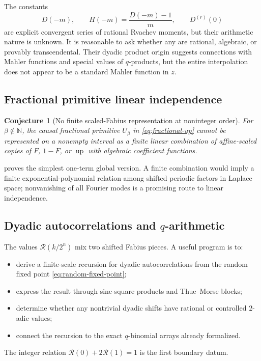 \documentclass[11pt]{article}
\newtheorem{conjecture}[theorem]{Conjecture}
\theoremstyle{definition}
\theoremstyle{remark}
\DeclareMathOperator{\upf}{up}
\newcommand{\N}{\mathbb N}
\begin{document}
The constants
\begin{equation}
 D(-m),\qquad H(-m)=\frac{D(-m)-1}{m},\qquad
 D^{(r)}(0)                                                \label{eq:arithmetic-constants}
\end{equation}
are explicit convergent series of rational Rvachev moments, but their arithmetic nature
is unknown.  It is reasonable to ask whether any are rational, algebraic, or provably
transcendental.  Their dyadic product origin suggests connections with Mahler functions
and special values of \(q\)-products, but the entire interpolation does not appear to be
a standard Mahler function in \(z\).

\subsection{Fractional primitive linear independence}

\begin{conjecture}[No finite scaled-Fabius representation at noninteger order]
For \(\beta\notin\N\), the causal fractional primitive \(U_\beta\) in
\eqref{eq:fractional-up} cannot be represented on a nonempty interval as a finite linear
combination of affine-scaled copies of \(F\), \(1-F\), or \(\upf\) with algebraic
coefficient functions.
\end{conjecture}

 proves the simplest one-term global version.  A finite
combination would imply a finite exponential-polynomial relation among shifted periodic
factors in Laplace space; nonvanishing of all Fourier modes is a promising route to
linear independence.

\subsection{Dyadic autocorrelations and \(q\)-arithmetic}

The values \(\mathcal R(k/2^n)\) mix two shifted Fabius pieces.  A useful program is to:
\begin{itemize}
  \item derive a finite-scale recursion for dyadic autocorrelations from the random fixed
        point \eqref{eq:random-fixed-point};
  \item express the result through sinc-square products and Thue--Morse blocks;
  \item determine whether any nontrivial dyadic shifts have rational or controlled
        \(2\)-adic values;
  \item connect the recursion to the exact \(q\)-binomial arrays already formalized.
\end{itemize}
The integer relation \(\mathcal R(0)+2\mathcal R(1)=1\) is the first boundary datum.
\end{document}
